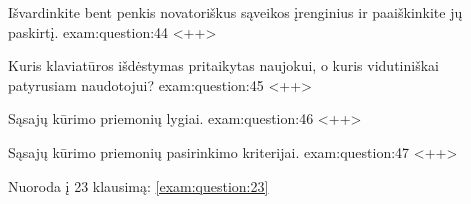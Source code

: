 \begin{question}{%
  Išvardinkite bent penkis novatoriškus sąveikos įrenginius ir
  paaiškinkite jų paskirtį.
  }{exam:question:44}
  <++>
\end{question}

\begin{question}{%
  Kuris klaviatūros išdėstymas pritaikytas naujokui, o kuris vidutiniškai
  patyrusiam naudotojui?
  }{exam:question:45}
  <++>
\end{question}

\begin{question}{%
  Sąsajų kūrimo priemonių lygiai.
  }{exam:question:46}
  <++>
\end{question}

\begin{question}{%
  Sąsajų kūrimo priemonių pasirinkimo kriterijai.
  }{exam:question:47}
  <++>
\end{question}

Nuoroda į 23 klausimą: \ref{exam:question:23}
